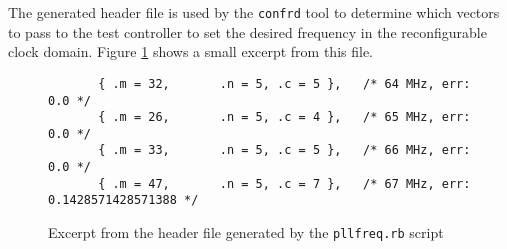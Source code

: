 The generated header file is used by the \texttt{confrd} tool to determine which vectors
to pass to the test controller to set the desired frequency in the reconfigurable
clock domain. Figure \ref{listing:pllfreq_h} shows a small excerpt from this file.

\begin{figure}[h!]
\lstset{basicstyle=\scriptsize\ttfamily}
\begin{lstlisting}
       { .m = 32,       .n = 5, .c = 5 },   /* 64 MHz, err: 0.0 */
       { .m = 26,       .n = 5, .c = 4 },   /* 65 MHz, err: 0.0 */
       { .m = 33,       .n = 5, .c = 5 },   /* 66 MHz, err: 0.0 */
       { .m = 47,       .n = 5, .c = 7 },   /* 67 MHz, err: 0.1428571428571388 */
\end{lstlisting}
\caption{Excerpt from the header file generated by the \texttt{pllfreq.rb} script}
\label{listing:pllfreq_h}
\end{figure}